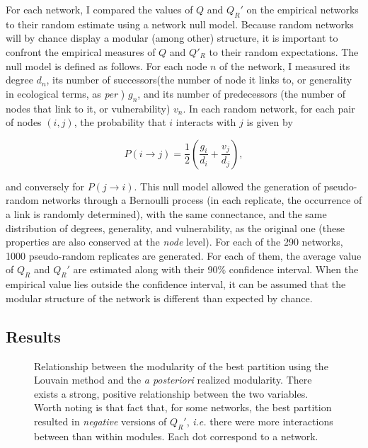 \documentclass[12pt,oneside]{article}
\begin{document}
For each network, I compared the values of $Q$ and $Q_R'$ on the empirical
networks to their random estimate using a network null model. Because random
networks will by chance display a modular (among other) structure, it is
important to confront the empirical measures of $Q$ and $Q'_R$ to their random
expectations. The null model is defined as follows. For each node $n$ of the
network, I measured its degree $d_n$, its number of successors(the number of
node it links to, or generality in ecological terms, as \emph{per}
\cite{schoener_food_1989}) $g_n$, and its number of predecessors (the number of
nodes that link to it, or vulnerability) $v_n$. In each random network, for
each pair of nodes $(i,j)$, the probability that $i$ interacts with $j$ is
given by

\begin{equation}
P(i\rightarrow j) = \frac{1}{2}\left(\frac{g_i}{d_i}+\frac{v_j}{d_j}\right),
\label{e:null}
\end{equation}

\noindent and conversely for $P(j \rightarrow i)$. This null model allowed the generation
of pseudo-random networks through a Bernoulli process (in each replicate, the
occurrence of a link is randomly determined), with the same connectance, and
the same distribution of degrees, generality, and vulnerability, as the
original one (these properties are also conserved at the \emph{node} level).
For each of the 290 networks, 1000 pseudo-random replicates are generated. For
each of them, the average value of $Q_R$ and $Q_R'$ are estimated along with
their 90\% confidence interval. When the empirical value lies outside the
confidence interval, it can be assumed that the modular structure of the network is
different than expected by chance.

\subsection{Results}

\begin{figure}[tbp]
\begin{center}
\end{center}
\caption{Relationship between the modularity of the best partition using the Louvain method and the \emph{a posteriori} realized modularity. There exists a strong, positive relationship between the two variables. Worth noting is that fact that, for some networks, the best partition resulted in \emph{negative} versions of $Q_R'$, \emph{i.e.} there were more interactions between than within modules. Each dot correspond to a network.}
\label{f:qqr}
\end{figure}
\end{document}
